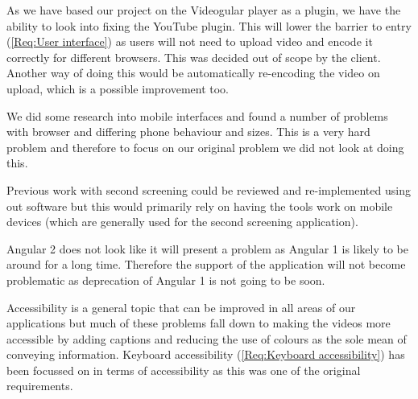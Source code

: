 As we have based our project on the Videogular player as a plugin, we have the ability to look into fixing the YouTube plugin. This will lower the barrier to entry (\cref{Req:User interface}) as users will not need to upload video and encode it correctly for different browsers. This was decided out of scope by the client. Another way of doing this would be automatically re-encoding the video on upload, which is a possible improvement too.

We did some research into mobile interfaces and found a number of problems with browser and differing phone behaviour and sizes. This is a very hard problem and therefore to focus on our original problem we did not look at doing this.

Previous work with second screening could be reviewed and re-implemented using out software but this would primarily rely on having the tools work on mobile devices (which are generally used for the second screening application).

Angular 2 does not look like it will present a problem as Angular 1 is likely to be around for a long time. Therefore the support of the application will not become problematic as deprecation of Angular 1 is not going to be soon.

Accessibility is a general topic that can be improved in all areas of our applications but much of these problems fall down to making the videos more accessible by adding captions and reducing the use of colours as the sole mean of conveying information. Keyboard accessibility (\cref{Req:Keyboard accessibility}) has been focussed on in terms of accessibility as this was one of the original requirements.
